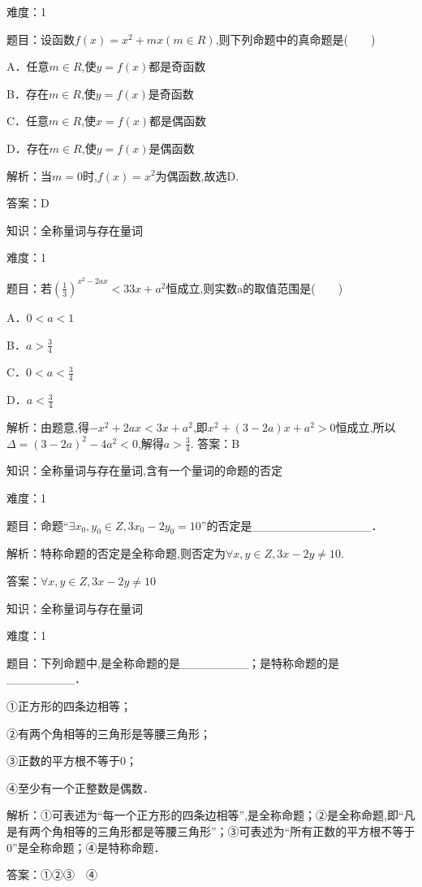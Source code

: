 \documentclass{article} %
\begin{document}
难度：1

题目：设函数$f(x)=x^{2}+mx(m{\in}R)$,则下列命题中的真命题是(　　)

A．任意$m{\in}R$,使$y=f(x)$都是奇函数

B．存在$m{\in}R$,使$y=f(x)$是奇函数

C．任意$m{\in}R$,使$x=f(x)$都是偶函数

D．存在$m{\in}R$,使$y=f(x)$是偶函数

解析：当$m=0$时,$f(x)=x^{2}$为偶函数,故选D.

答案：D



知识：全称量词与存在量词

难度：1

题目：若$(\frac{1}{3})^{x^2-2ax}<33x+a^{2}$恒成立,则实数a的取值范围是(　　)

A．$0<a<1$   

B．$a>\frac{3}{4}$

C．$0<a<\frac{3}{4}$   

D．$a<\frac{3}{4}$

解析：由题意,得$-x^{2}+2ax<3x+a^{2}$,即$x^{2}+(3-2a)x+a^{2}>0$恒成立,所以$\Delta=(3-2a)^{2}-4a^{2}<0$,解得$a>\frac{3}{4}$.
答案：B



知识：全称量词与存在量词,含有一个量词的命题的否定

难度：1

题目：命题``${\exists }x_{0},y_{0}{\in}Z,3x_{0}-2y_{0}=10$''的否定是\_\_\_\_\_\_\_\_\_\_\_\_\_\_．

解析：特称命题的否定是全称命题,则否定为${\forall }x,y{\in}Z,3x-2y{\neq}10$.

答案：${\forall }x,y{\in}Z,3x-2y{\neq}10$



知识：全称量词与存在量词

难度：1

题目：下列命题中,是全称命题的是\_\_\_\_\_\_\_\_；是特称命题的是\_\_\_\_\_\_\_\_．

①正方形的四条边相等；

②有两个角相等的三角形是等腰三角形；

③正数的平方根不等于0；

④至少有一个正整数是偶数．

解析：①可表述为``每一个正方形的四条边相等'',是全称命题；②是全称命题,即``凡是有两个角相等的三角形都是等腰三角形''；③可表述为``所有正数的平方根不等于0''是全称命题；④是特称命题．

答案：①②③　④
\end{document}
